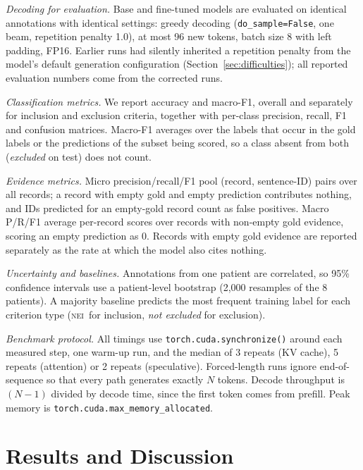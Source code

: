 \documentclass[conference]{IEEEtran}
\newcommand{\NEI}{\textsc{nei}}
\begin{document}
\textit{Decoding for evaluation.} Base and fine-tuned models are evaluated on identical annotations with identical settings: greedy decoding (\texttt{do\_sample=False}, one beam, repetition penalty 1.0), at most 96 new tokens, batch size 8 with left padding, FP16. Earlier runs had silently inherited a repetition penalty from the model's default generation configuration (Section~\ref{sec:difficulties}); all reported evaluation numbers come from the corrected runs.

\textit{Classification metrics.} We report accuracy and macro-F1, overall and separately for inclusion and exclusion criteria, together with per-class precision, recall, F1 and confusion matrices. Macro-F1 averages over the labels that occur in the gold labels or the predictions of the subset being scored, so a class absent from both (\emph{excluded} on test) does not count.

\textit{Evidence metrics.} Micro precision/recall/F1 pool (record, sentence-ID) pairs over all records; a record with empty gold and empty prediction contributes nothing, and IDs predicted for an empty-gold record count as false positives. Macro P/R/F1 average per-record scores over records with non-empty gold evidence, scoring an empty prediction as 0. Records with empty gold evidence are reported separately as the rate at which the model also cites nothing.

\textit{Uncertainty and baselines.} Annotations from one patient are correlated, so 95\% confidence intervals use a patient-level bootstrap (2{,}000 resamples of the 8 patients). A majority baseline predicts the most frequent training label for each criterion type (\NEI\ for inclusion, \emph{not excluded} for exclusion).

\textit{Benchmark protocol.} All timings use \texttt{torch.cuda.synchronize()} around each measured step, one warm-up run, and the median of 3 repeats (KV cache), 5 repeats (attention) or 2 repeats (speculative). Forced-length runs ignore end-of-sequence so that every path generates exactly $N$ tokens. Decode throughput is $(N{-}1)$ divided by decode time, since the first token comes from prefill. Peak memory is \texttt{torch.cuda.max\_memory\_allocated}.

\section{Results and Discussion}
\end{document}
